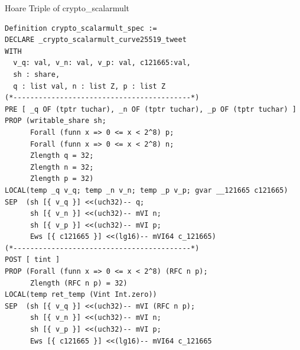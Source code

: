 \documentclass[8pt,aspectratio=169]{beamer}
\begin{document}
%
%





%
%
\begin{frame}[fragile]{Hoare Triple of crypto\_scalarmult}
	\begin{lstlisting}[language=CoqVST]
Definition crypto_scalarmult_spec :=
DECLARE _crypto_scalarmult_curve25519_tweet
WITH
  v_q: val, v_n: val, v_p: val, c121665:val,
  sh : share,
  q : list val, n : list Z, p : list Z
(*------------------------------------------*)
PRE [ _q OF (tptr tuchar), _n OF (tptr tuchar), _p OF (tptr tuchar) ]
PROP (writable_share sh;
      Forall (funn x => 0 <= x < 2^8) p;
      Forall (funn x => 0 <= x < 2^8) n;
      Zlength q = 32;
      Zlength n = 32;
      Zlength p = 32)
LOCAL(temp _q v_q; temp _n v_n; temp _p v_p; gvar __121665 c121665)
SEP  (sh [{ v_q }] <<(uch32)-- q;
      sh [{ v_n }] <<(uch32)-- mVI n;
      sh [{ v_p }] <<(uch32)-- mVI p;
      Ews [{ c121665 }] <<(lg16)-- mVI64 c_121665)
(*------------------------------------------*)
POST [ tint ]
PROP (Forall (funn x => 0 <= x < 2^8) (RFC n p);
      Zlength (RFC n p) = 32)
LOCAL(temp ret_temp (Vint Int.zero))
SEP  (sh [{ v_q }] <<(uch32)-- mVI (RFC n p);
      sh [{ v_n }] <<(uch32)-- mVI n;
      sh [{ v_p }] <<(uch32)-- mVI p;
      Ews [{ c121665 }] <<(lg16)-- mVI64 c_121665
\end{lstlisting}
\end{frame}
\end{document}
